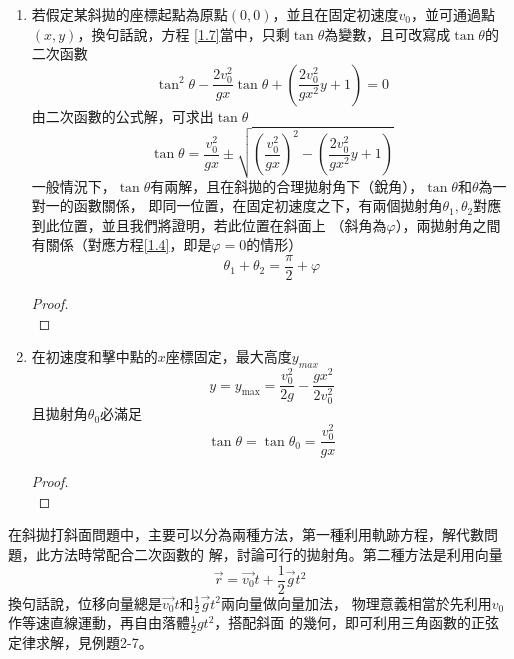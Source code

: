 \documentclass[cn,10pt,math=newtx,chinesefont=founder]{../elegantbook}
\begin{document}
\begin{enumerate}
    \item 

若假定某斜拋的座標起點為原點$(0,0)$，並且在固定初速度$v_0$，並可通過點$(x, y)$，換句話說，方程
\ref{1.7}當中，只剩$\tan \theta$為變數，且可改寫成$\tan \theta$的二次函數
\begin{equation}
    \operatorname{tan}^{2} \theta-\frac{2 v_{0}^{2}}{g x} \operatorname{tan} \theta+\left(\frac{2 v_{0}^{2}}{g x^{2}} y+1\right)=0
\end{equation}
由二次函數的公式解，可求出$\tan \theta$
\begin{equation}
    \operatorname{tan} \theta=\frac{v_{0}^{2}}{g x} \pm \sqrt{\left(\frac{v_{0}^{2}}{g x}\right)^{2}-\left(\frac{2 v_{0}^{2}}{g x^{2}} y+1\right)}
\end{equation}
一般情況下，$\tan \theta$有兩解，且在斜拋的合理拋射角下（銳角），$\tan \theta$和$\theta$為一對一的函數關係，
即同一位置，在固定初速度之下，有兩個拋射角$\theta_1, \theta_2$對應到此位置，並且我們將證明，若此位置在斜面上
（斜角為$\varphi$），兩拋射角之間有關係（對應方程\ref{1.4}，即是$\varphi = 0$的情形）
\begin{equation}
    \theta_1+\theta_2 = \frac{\pi}{2}+\varphi
\end{equation}
\begin{proof}
    \\[20em]
\end{proof}
    \item 在初速度和擊中點的$x$座標固定，最大高度$y_{max}$
    \begin{equation}
        y=y_{\max }=\frac{v_{0}^{2}}{2 g}-\frac{g x^{2}}{2 v_{0}^{2}}
    \end{equation}
    且拋射角$\theta_0$必滿足
    \begin{equation}
        \operatorname{tan} \theta=\operatorname{tan} \theta_{0}=\frac{v_{0}^{2}}{g x}
    \end{equation}
    \begin{proof}
        \\[20em]
    \end{proof}

\end{enumerate}
在斜拋打斜面問題中，主要可以分為兩種方法，第一種利用軌跡方程，解代數問題，此方法時常配合二次函數的
解，討論可行的拋射角。第二種方法是利用向量
\begin{equation}
    \vec{r} = \vec{v_0}t+\frac{1}{2}\vec{g}t^2 
\end{equation}
換句話說，位移向量總是$\vec{v_0}t$和$\frac{1}{2}\vec{g}t^2$兩向量做向量加法，
物理意義相當於先利用$v_0$作等速直線運動，再自由落體$\frac{1}{2}gt^2$，搭配斜面
的幾何，即可利用三角函數的正弦定律求解，見例題2-7。
\end{document}
